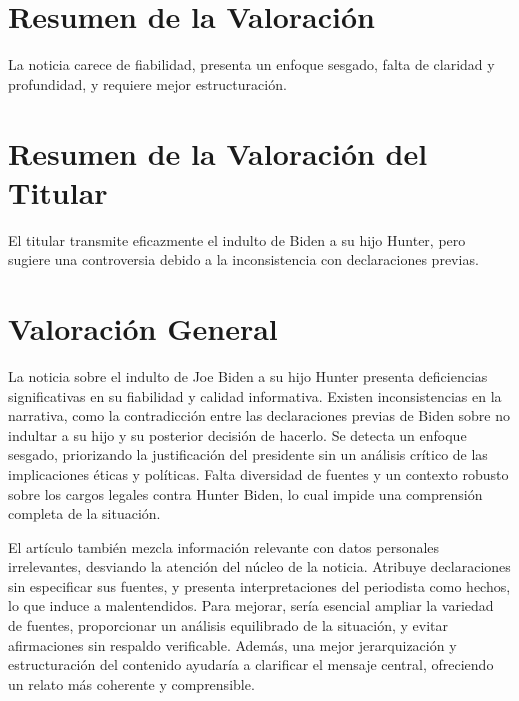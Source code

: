 \documentclass[10pt,a4paper]{article}
\begin{document}
\section*{Resumen de la Valoración}
    La noticia carece de fiabilidad, presenta un enfoque sesgado, falta de claridad y profundidad, y requiere mejor estructuraci\'{o}n.
\vspace{1em}

\section*{Resumen de la Valoración del Titular}
    El titular transmite eficazmente el indulto de Biden a su hijo Hunter, pero sugiere una controversia debido a la inconsistencia con declaraciones previas.
\vspace{1em}

\section*{Valoración General}
    La noticia sobre el indulto de Joe Biden a su hijo Hunter presenta deficiencias significativas en su fiabilidad y calidad informativa. Existen inconsistencias en la narrativa, como la contradicci\'{o}n entre las declaraciones previas de Biden sobre no indultar a su hijo y su posterior decisi\'{o}n de hacerlo. Se detecta un enfoque sesgado, priorizando la justificaci\'{o}n del presidente sin un an\'{a}lisis cr\'{i}tico de las implicaciones \'{e}ticas y pol\'{i}ticas. Falta diversidad de fuentes y un contexto robusto sobre los cargos legales contra Hunter Biden, lo cual impide una comprensi\'{o}n completa de la situaci\'{o}n.
\par\medskip
El art\'{i}culo tambi\'{e}n mezcla informaci\'{o}n relevante con datos personales irrelevantes, desviando la atenci\'{o}n del n\'{u}cleo de la noticia. Atribuye declaraciones sin especificar sus fuentes, y presenta interpretaciones del periodista como hechos, lo que induce a malentendidos. Para mejorar, ser\'{i}a esencial ampliar la variedad de fuentes, proporcionar un an\'{a}lisis equilibrado de la situaci\'{o}n, y evitar afirmaciones sin respaldo verificable. Adem\'{a}s, una mejor jerarquizaci\'{o}n y estructuraci\'{o}n del contenido ayudar\'{i}a a clarificar el mensaje central, ofreciendo un relato m\'{a}s coherente y comprensible.
\vspace{1em}
\end{document}
